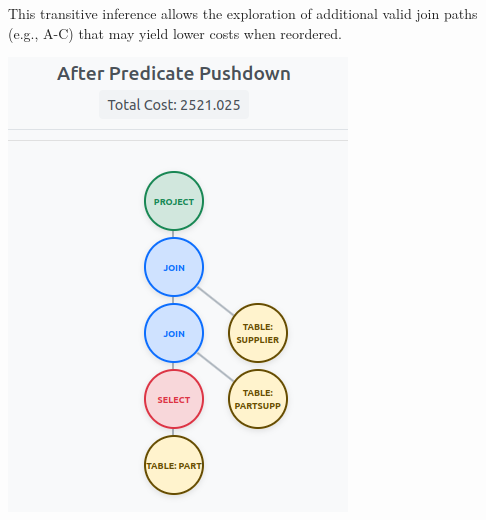 \documentclass[12pt]{article}
\begin{document}
This transitive inference allows the exploration of additional valid join paths (e.g., A-C) that may yield lower costs when reordered.

\begin{table}[h]
  \centering
   \begin{minipage}[t]{0.48\textwidth}
    \centering
    \includegraphics[width=\textwidth]{images/join_ex_before.png}
  \end{minipage}
  \hfill
  \begin{minipage}[t]{0.48\textwidth}
    \centering

\end{minipage}
\end{table}
\end{document}
